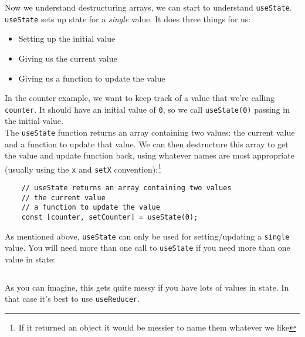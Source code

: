 Now we understand destructuring arrays, we can start to understand \texttt{useState}.
\\

\texttt{useState} sets up state for a \textit{single} value. It does three things for us:

\begin{itemize}
    \item Setting up the initial value
    \item Giving us the current value
    \item Giving us a function to update the value
\end{itemize}

In the counter example, we want to keep track of a value that we're calling \texttt{counter}. It should have an initial value of \texttt{0}, so we call \texttt{useState(0)} passing in the initial value.
\\

The \texttt{useState} function returns an array containing two values: the current value and a function to update that value. We can then destructure this array to get the value and update function back, using whatever names are most appropriate (usually using the \texttt{x} and \texttt{setX} convention):\footnote{If it returned an object it would be messier to name them whatever we like}

\begin{verbatim}
    // useState returns an array containing two values
    // the current value
    // a function to update the value
    const [counter, setCounter] = useState(0);
\end{verbatim}

As mentioned above, \texttt{useState} can only be used for setting/updating a \texttt{single} value. You will need more than one call to \texttt{useState} if you need more than one value in state:

\inputminted{js}{04-hooks/figures/03-multiple-useState.js}

As you can imagine, this gets quite messy if you have lots of values in state. In that case it's best to use \texttt{useReducer}.

\pagebreak


